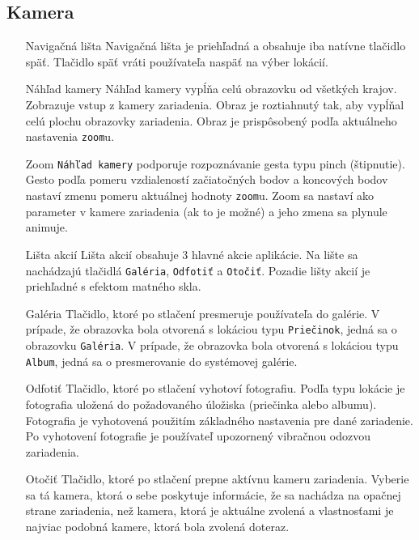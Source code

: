 \documentclass[11pt]{article} %
\begin{document}
\subsection{Kamera}
\begin{itemize}
\item[Navigačná lišta]{
	Navigačná lišta je priehľadná a obsahuje iba natívne tlačidlo späť. Tlačidlo späť vráti používateľa naspäť na výber lokácií.
}
\item[Náhľad kamery]{
	Náhľad kamery vypĺňa celú obrazovku od všetkých krajov. Zobrazuje vstup z kamery zariadenia. Obraz je roztiahnutý tak, aby vypĺňal celú plochu obrazovky zariadenia. Obraz je prispôsobený podľa aktuálneho nastavenia {\tt zoom}u.
}
\item[Zoom]{
	{\tt Náhľad kamery} podporuje rozpoznávanie gesta typu pinch (štipnutie). Gesto podľa pomeru vzdialeností začiatočných bodov a koncových bodov nastaví zmenu pomeru aktuálnej hodnoty {\tt zoom}u. Zoom sa nastaví ako parameter v kamere zariadenia (ak to je možné) a jeho zmena sa plynule animuje.
}
\item[Lišta akcií]{
	Lišta akcií obsahuje 3 hlavné akcie aplikácie. Na lište sa nachádzajú tlačidlá {\tt Galéria}, {\tt Odfotiť} a {\tt Otočiť}. Pozadie lišty akcií je priehľadné s efektom matného skla.
}
\item[Galéria]{
	Tlačidlo, ktoré po stlačení presmeruje používateľa do galérie. V prípade, že obrazovka bola otvorená s lokáciou typu {\tt Priečinok}, jedná sa o obrazovku {\tt Galéria}. V prípade, že obrazovka bola otvorená s lokáciou typu {\tt Album}, jedná sa o presmerovanie do systémovej galérie.
}
\item[Odfotiť]{
	Tlačidlo, ktoré po stlačení vyhotoví fotografiu. Podľa typu lokácie je fotografia uložená do požadovaného úložiska (priečinka alebo albumu). Fotografia je vyhotovená použitím základného nastavenia pre dané zariadenie. Po vyhotovení fotografie je používateľ upozornený vibračnou odozvou zariadenia.
}
\item[Otočiť]{
	Tlačidlo, ktoré po stlačení prepne aktívnu kameru zariadenia. Vyberie sa tá kamera, ktorá o sebe poskytuje informácie, že sa nachádza na opačnej strane zariadenia, než kamera, ktorá je aktuálne zvolená a vlastnosťami je najviac podobná kamere, ktorá bola zvolená doteraz.
}
\end{itemize}
\end{document}
